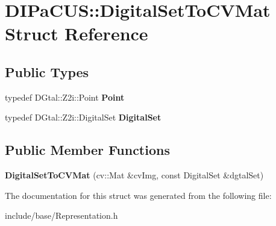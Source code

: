 \hypertarget{structDIPaCUS_1_1DigitalSetToCVMat}{}\section{D\+I\+Pa\+C\+US\+:\+:Digital\+Set\+To\+C\+V\+Mat Struct Reference}
\label{structDIPaCUS_1_1DigitalSetToCVMat}
\subsection*{Public Types}
\begin{DoxyCompactItemize}
\item 
\mbox{\label{structDIPaCUS_1_1DigitalSetToCVMat_aeaa3c81f0c34dac928e4d8ad4d44b346}} 
typedef D\+Gtal\+::\+Z2i\+::\+Point {\bfseries Point}
\item 
\mbox{\label{structDIPaCUS_1_1DigitalSetToCVMat_ade8fd2fc08c9941a340b6e4221da95be}} 
typedef D\+Gtal\+::\+Z2i\+::\+Digital\+Set {\bfseries Digital\+Set}
\end{DoxyCompactItemize}
\subsection*{Public Member Functions}
\begin{DoxyCompactItemize}
\item 
\mbox{\label{structDIPaCUS_1_1DigitalSetToCVMat_adc114469e852e95a842748905539a937}} 
{\bfseries Digital\+Set\+To\+C\+V\+Mat} (cv\+::\+Mat \&cv\+Img, const Digital\+Set \&dgtal\+Set)
\end{DoxyCompactItemize}


The documentation for this struct was generated from the following file\+:\begin{DoxyCompactItemize}
\item 
include/base/Representation.\+h\end{DoxyCompactItemize}
